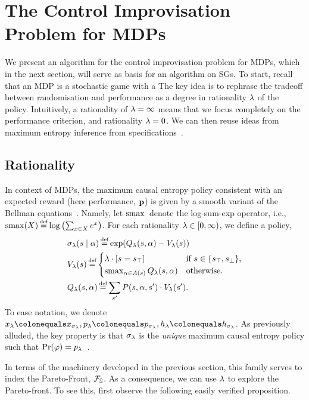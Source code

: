 \section{The Control Improvisation Problem for MDPs}
\label{sec:mdps}

We present an algorithm for the control improvisation problem for
MDPs, which in the next section, will serve as basis for an algorithm
on SGs. To start, recall that an MDP is a stochastic game with a The
key idea is to rephrase the tradeoff between randomisation and
performance as a degree in rationality $\lambda$ of the
policy. Intuitively, a rationality of $\lambda = \infty$ means that we
focus completely on the performance criterion, and rationality $\lambda =
0$. We can then reuse ideas from maximum entropy inference from
specifications~\cite{DBLP:conf/cav/Vazquez-Chanlatte20}.

\subsection{Rationality}

\noindent
In context of MDPs, the maximum causal entropy policy consistent with
an expected reward (here performance, $\mathbf{p}$) is given by a
smooth variant of the Bellman equations~\cite{mceThesis}. Namely, let
$\operatorname*{\mathrm{smax}}{}$ denote the log-sum-exp operator, i.e., $\smoothmax(X)
\eqdef \log \left( \sum_{x\in X} e^x \right)$. For each rationality
$\lambda \in [0, \infty)$, we define a policy,
 \begin{align}
   &\sched_\rat(s\mid \act) \eqdef \exp( Q_\rat(s,\act) - V_\rat(s))  \\
   & V_\rat(s) \eqdef  \begin{cases}
     \lambda  \cdot \indicator{s = \target} & \text{if }s \in \{ \target, \sink \},\\
     \smoothmax_{\act \in \EnAct(s)}{  Q_\rat(s,\act) } & \text{otherwise.}
   \end{cases}\\ 
	& Q_\rat(s, \act) \eqdef \sum_{s'} P(s,\act,s') \cdot V_\rat(s').
 \end{align}
To ease notation, we denote $x_\rat \colonequals x_{\sched_\rat},
\scp_\rat \colonequals \scp_{\sched_\rat}, \rndp_\rat \colonequals
\rndp_{\sched_\rat}$. As previously alluded, the key property
is that $\sigma_\lambda$ is the \emph{unique} maximum causal entropy policy
such that $\Pr(\varphi) = p_\lambda$~\cite{DBLP:conf/cav/Vazquez-Chanlatte20}.

In terms of the machinery developed in the previous section, this
family serves to index the Pareto-Front, $\mathcal{F}_{\mathbb{S}}$.  As a
consequence, we can use $\lambda$ to explore the Pareto-front.  To see
this, first observe the following easily verified proposition.

